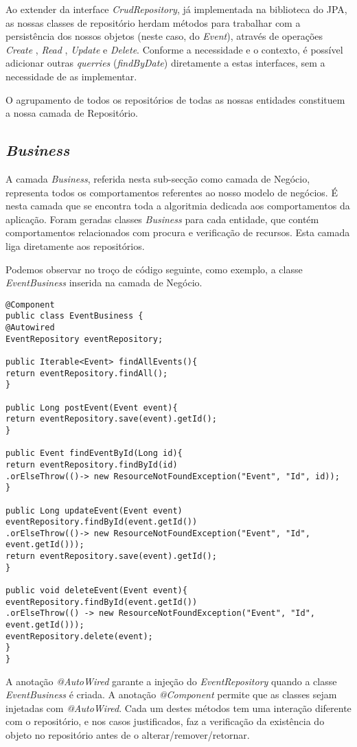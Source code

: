 Ao extender da interface \emph{CrudRepository}, já implementada na biblioteca do JPA, as nossas classes de repositório herdam métodos para trabalhar com a persistência dos nossos objetos (neste caso, do \emph{Event}), através de operações \emph{Create} , \emph{Read} , \emph{Update} e \emph{Delete}. Conforme a necessidade e o contexto, é possível adicionar
outras \emph{querries} (\emph{findByDate}) diretamente a estas interfaces, sem a necessidade de as implementar. 

O agrupamento de todos os repositórios de todas as nossas entidades constituem a nossa camada de Repositório.
\subsection{\emph{Business}} \label{sec313}
A camada \emph{Business}, referida nesta sub-secção como camada de Negócio, representa todos os comportamentos referentes ao nosso modelo de negócios.
É nesta camada que se encontra toda a algoritmia dedicada aos comportamentos da aplicação. Foram geradas classes \emph{Business} para cada entidade, que contém comportamentos relacionados com procura e verificação de recursos. Esta camada liga diretamente aos repositórios.

Podemos observar no troço de código seguinte, como exemplo, a classe \emph{EventBusiness} inserida na camada de Negócio.
\begin{verbatim}
@Component
public class EventBusiness {
@Autowired
EventRepository eventRepository;

public Iterable<Event> findAllEvents(){
return eventRepository.findAll();
}

public Long postEvent(Event event){
return eventRepository.save(event).getId();
}

public Event findEventById(Long id){
return eventRepository.findById(id)
.orElseThrow(()-> new ResourceNotFoundException("Event", "Id", id));
}

public Long updateEvent(Event event)
eventRepository.findById(event.getId())
.orElseThrow(()-> new ResourceNotFoundException("Event", "Id", event.getId()));
return eventRepository.save(event).getId();
}

public void deleteEvent(Event event){
eventRepository.findById(event.getId())
.orElseThrow(() -> new ResourceNotFoundException("Event", "Id", event.getId()));
eventRepository.delete(event);
}
}
\end{verbatim}

A anotação \emph{@AutoWired} garante a injeção do \emph{EventRepository} quando a classe \emph{EventBusiness} é criada. A anotação \emph{@Component} permite que as classes sejam injetadas com \emph{@AutoWired}. Cada um destes métodos tem uma interação diferente com o repositório, e nos casos justificados, faz a verificação da existência do objeto no repositório antes de o alterar/remover/retornar.

